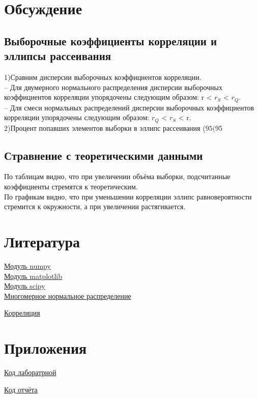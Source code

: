 \documentclass[a4]{article}
\begin{document}
	\section{Обсуждение}
		\subsection{Выборочные коэффициенты корреляции и эллипсы рассеивания}
			1)Сравним дисперсии выборочных коэффициентов корреляции.\\
			– Для двумерного нормального распределения дисперсии выборочных коэффициентов корреляции упорядочены следующим образом: r < $r_S$ < $r_Q$.\\
			– Для смеси нормальных распределений дисперсии выборочных
			коэффициентов корреляции упорядочены следующим образом:
			$r_Q$ < $r_S$ < r.\\
			
			2)Процент попавших элементов выборки в эллипс рассеивания ($95%
			($95%
		\subsection{Стравнение с теоретическими данными}
		По таблицам видно, что при увеличении объёма выборки, подсчитанные коэффициенты стремятся к теоретическим.\\
		По графикам видно, что при уменьшении корреляции эллипс равновероятности стремится к окружности, а при увеличении растягивается.
	\section{Литература}
	
	\href{https://physics.susu.ru/vorontsov/language/numpy.html}{Модуль numpy}\\
	
	\href{https://matplotlib.org/}{Модуль matplotlib}\\
	
	\href{https://www.scipy.org/}{Модуль scipy}\\
	
	
	\href{https://ru.wikipedia.org/wiki/%D0%9C%D0%BD%D0%BE%D0%B3%D0%BE%D0%BC%D0%B5%D1%80%D0%BD%D0%BE%D0%B5_%D0%BD%D0%BE%D1%80%D0%BC%D0%B0%D0%BB%D1%8C%D0%BD%D0%BE%D0%B5_%D1%80%D0%B0%D1%81%D0%BF%D1%80%D0%B5%D0%B4%D0%B5%D0%BB%D0%B5%D0%BD%D0%B8%D0%B5}{Многомерное нормальное распределение}
	
	\href{https://ru.wikipedia.org/wiki/%D0%9A%D0%BE%D1%80%D1%80%D0%B5%D0%BB%D1%8F%D1%86%D0%B8%D1%8F}{Корреляция}
	
	
	\section{Приложения}
	
	\href{https://github.com/LuciusGen/Matstat/blob/master/Lab5/Lab5.py}{Код лаборатрной}
	
	\href{https://github.com/LuciusGen/Matstat/blob/master/Lab5/lab5.tex}{Код отчёта}
	
\end{document}
